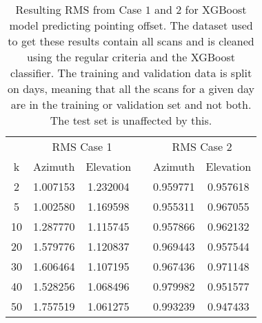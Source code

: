 \begin{table}[h]
    \centering %
    \caption{Resulting RMS from Case $1$ and $2$ for XGBoost model predicting pointing offset.
    The dataset used to get these results contain all scans and is cleaned using the regular criteria and the XGBoost classifier.
    The training and validation data is split on days, meaning that all the scans for a given day
    are in the training or validation set and not both. The test set is unaffected by this.}
    \begin{tabular}{ccc c cc}
        \toprule
        \multicolumn{1}{c}{} & \multicolumn{2}{c}{RMS Case 1} & & \multicolumn{2}{c}{RMS Case 2} \\
        \cmidrule(lr){2-3} \cmidrule(lr){5-6}
         k & Azimuth & Elevation & & Azimuth & Elevation \\
        \midrule
        2 &  1.007153 &  1.232004 & &  0.959771 &  0.957618 \\
        5 &  1.002580 &  1.169598 & &  0.955311 &  0.967055 \\
       10 &  1.287770 &  1.115745 & &  0.957866 &  0.962132 \\
       20 &  1.579776 &  1.120837 & &  0.969443 &  0.957544 \\
       30 &  1.606464 &  1.107195 & &  0.967436 &  0.971148 \\
       40 &  1.528256 &  1.068496 & &  0.979982 &  0.951577 \\
       50 &  1.757519 &  1.061275 & &  0.993239 &  0.947433 \\
        \bottomrule
    \end{tabular}
\end{table}

